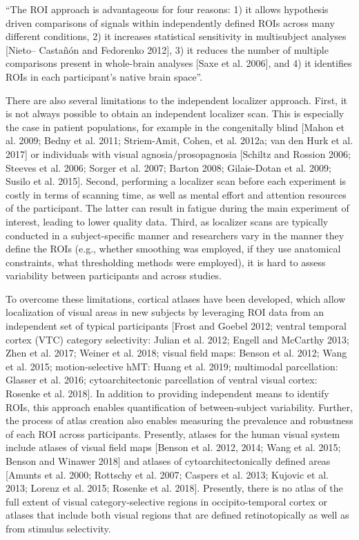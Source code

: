 ``The ROI approach is advantageous for four reasons:
%
1) it allows hypothesis driven comparisons of signals within independently
defined ROIs across many different conditions,
%
2) it increases statistical sensitivity in multisubject analyses [Nieto–
Castañón and Fedorenko 2012],
%
3) it reduces the number of multiple comparisons present in whole-brain analyses
[Saxe et al.  2006], and
%
4) it identifies ROIs in each participant's native brain space''.

There are also several limitations to the independent localizer approach.
%
First, it is not always possible to obtain an independent localizer scan.
%
This is especially the case in patient populations, for example in the
congenitally blind [Mahon et al. 2009; Bedny et al. 2011; Striem-Amit, Cohen, et
al. 2012a; van den Hurk et al. 2017] or individuals with visual
agnosia/prosopagnosia [Schiltz and Rossion 2006; Steeves et al. 2006; Sorger et
al.  2007; Barton 2008; Gilaie-Dotan et al. 2009; Susilo et al. 2015].
%
Second, performing a localizer scan before each experiment is costly in terms of
scanning time, as well as mental effort and attention resources of the
participant.
%
The latter can result in fatigue during the main experiment of interest, leading
to lower quality data.
%
Third, as localizer scans are typically conducted in a subject-specific manner
and researchers vary in the manner they define the ROIs (e.g., whether smoothing
was employed, if they use anatomical constraints, what thresholding methods were
employed), it is hard to assess variability between participants and across
studies.

To overcome these limitations, cortical atlases have been developed, which
allow localization of visual areas in new subjects by leveraging ROI data from
an independent set of typical participants [Frost and Goebel 2012; ventral
temporal cortex (VTC) category selectivity: Julian et al. 2012; Engell and
McCarthy 2013; Zhen et al.  2017; Weiner et al. 2018; visual field maps: Benson
et al. 2012; Wang et al. 2015; motion-selective hMT: Huang et al. 2019;
multimodal parcellation: Glasser et al. 2016; cytoarchitectonic parcellation of
ventral visual cortex: Rosenke et al. 2018].
%
In addition to providing independent means to identify ROIs, this approach
enables quantification of between-subject variability.
%
Further, the process of atlas creation also enables measuring the prevalence and
robustness of each ROI across participants.
%
Presently, atlases for the human visual system include atlases of visual field
maps [Benson et al. 2012, 2014; Wang et al.  2015; Benson and Winawer 2018] and
atlases of cytoarchitectonically defined areas [Amunts et al. 2000; Rottschy et
al. 2007; Caspers et al. 2013; Kujovic et al. 2013; Lorenz et al. 2015; Rosenke
et al. 2018].
%
Presently, there is no atlas of the full extent of visual category-selective
regions in occipito-temporal cortex or atlases that include both visual regions
that are defined retinotopically as well as from stimulus selectivity.

